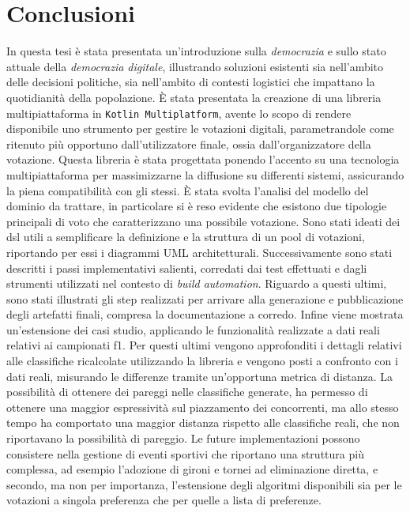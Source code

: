 \documentclass[12pt,a4paper,openright,twoside]{book}
\begin{document}
\chapter{Conclusioni}
In questa tesi è stata presentata un'introduzione sulla \textit{democrazia} e sullo stato attuale 
della \textit{democrazia digitale}, illustrando soluzioni esistenti sia nell'ambito delle decisioni
politiche, sia nell'ambito di contesti logistici che impattano la quotidianità della popolazione.
È stata presentata la creazione di una libreria multipiattaforma in \texttt{Kotlin Multiplatform},
avente lo scopo di rendere disponibile uno strumento per gestire le votazioni digitali, parametrandole
come ritenuto più opportuno dall'utilizzatore finale, ossia dall'organizzatore della votazione.
Questa libreria è stata  progettata ponendo l'accento su una tecnologia multipiattaforma per 
massimizzarne la diffusione su differenti sistemi, assicurando la piena compatibilità con gli stessi.
È stata svolta l'analisi del modello del dominio da trattare, in particolare si è reso evidente
che esistono due tipologie principali di voto che caratterizzano una possibile votazione.
Sono stati ideati dei \ac{dsl} utili a semplificare la definizione e la struttura di un pool di votazioni,
riportando per essi i diagrammi UML architetturali.
Successivamente sono stati descritti i passi implementativi salienti, corredati dai test effettuati
e dagli strumenti utilizzati nel contesto di \textit{build automation}.
Riguardo a questi ultimi, sono stati illustrati gli step realizzati per arrivare alla generazione
e pubblicazione degli artefatti finali, compresa la documentazione a corredo.
Infine viene mostrata un'estensione dei casi studio, applicando le funzionalità realizzate a
dati reali relativi ai campionati \ac{f1}.
Per questi ultimi vengono approfonditi i dettagli relativi alle classifiche ricalcolate utilizzando
la libreria e vengono posti a confronto con i dati reali, misurando le differenze tramite un'opportuna
metrica di distanza. La possibilità di ottenere dei pareggi nelle classifiche generate, ha permesso di
ottenere una maggior espressività sul piazzamento dei concorrenti, ma allo stesso tempo ha comportato 
una maggior distanza rispetto alle classifiche reali, che non riportavano la possibilità di pareggio.
Le future implementazioni possono consistere nella gestione di eventi sportivi che riportano una
struttura più complessa, ad esempio l'adozione di gironi e tornei ad eliminazione diretta,
e secondo, ma non per importanza, l'estensione degli algoritmi disponibili sia per le votazioni a 
singola preferenza che per quelle a lista di preferenze.


\backmatter

\nocite{*} %




\end{document}
